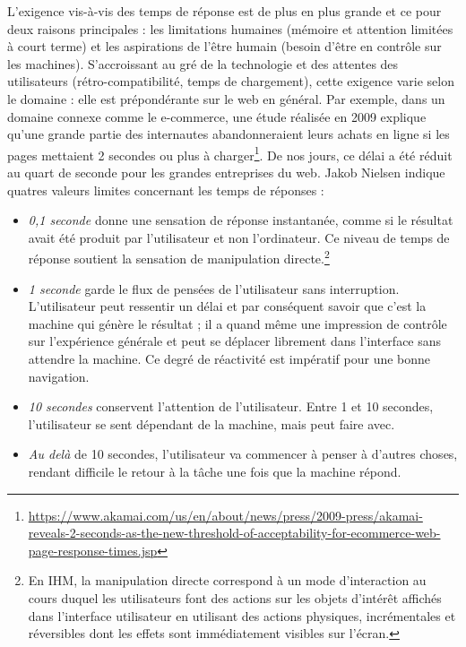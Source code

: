 L'exigence vis-à-vis des temps de réponse est de plus en plus 
grande et ce pour deux raisons principales : les limitations humaines (mémoire et 
attention limitées 
à court terme) et les aspirations de l'être humain (besoin d'être en contrôle sur les 
machines). S'accroissant au gré de la technologie et des attentes des 
utilisateurs (rétro-compatibilité, temps de 
chargement), cette exigence varie selon le domaine : elle est prépondérante sur le 
web en général. 
Par exemple, dans un domaine connexe comme le e-commerce, une étude réalisée 
en 2009 explique qu’une grande partie des internautes abandonneraient leurs achats 
en ligne si les pages mettaient 2 secondes ou plus à charger\footnote{\url{https://www.akamai.com/us/en/about/news/press/2009-press/akamai-reveals-2-seconds-as-the-new-threshold-of-acceptability-for-ecommerce-web-page-response-times.jsp}}. De nos jours, ce 
délai a été réduit au quart de seconde pour les grandes entreprises du web. Jakob 
Nielsen \cite{Nielsen1993a} indique quatres valeurs limites concernant les 
temps de réponses :
\begin{itemize}
	\item \textit{0,1 seconde} donne une sensation de réponse instantanée, comme 
	si le 
	résultat avait été produit par l'utilisateur et non l'ordinateur. Ce niveau de temps 
	de réponse soutient la sensation de manipulation directe.\footnote{En IHM, la 
		manipulation directe correspond à un mode d'interaction au cours duquel les 
		utilisateurs font des actions sur les objets d'intérêt affichés dans l'interface 
		utilisateur en utilisant des actions physiques, incrémentales et réversibles 
		dont 
		les effets sont immédiatement visibles sur l'écran.} 
	\item \textit{1 seconde} garde le flux de pensées de l'utilisateur sans 
	interruption. 
	L'utilisateur peut ressentir un délai et par conséquent savoir que c'est la 
	machine qui génère le résultat ; il a quand même une impression de 
	contrôle sur l'expérience générale et peut se déplacer librement dans l'interface 
	sans attendre la machine. Ce degré de réactivité est impératif pour une bonne 
	navigation.
	\item \textit{10 secondes} conservent l'attention de l'utilisateur. Entre 1 et 10 
	secondes, l'utilisateur se sent dépendant de la machine, mais peut faire avec. 
	\item \textit{Au delà} de 10 secondes, l'utilisateur va commencer à penser à d'autres choses, rendant difficile 
	le retour à la tâche une fois que la machine répond.
\end{itemize} 
